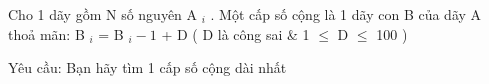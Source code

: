 Cho 1 dãy gồm N số nguyên  A   $_    i   $   . Một cấp số cộng là 1 dãy con B của dãy A thoả mãn: B   $_    i   $   =  B   $_    i-1   $   + D ( D là công sai \& 1  $\le$  D  $\le$  100 )  

   Yêu cầu: Bạn hãy tìm 1 cấp số cộng dài nhất  

\